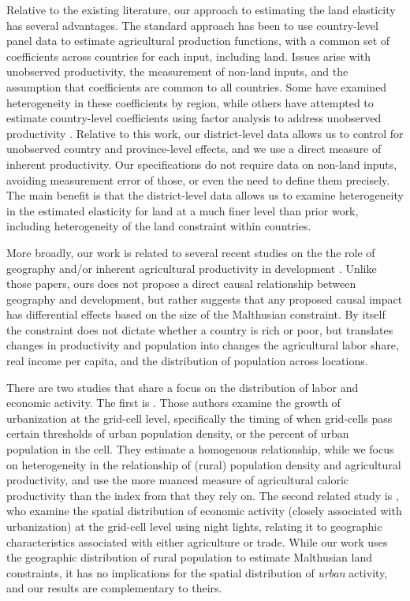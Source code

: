 \documentclass[11pt]{article}
\begin{document}
Relative to the existing literature, our approach to estimating the land elasticity has several advantages. The standard approach has been to use country-level panel data \citep{Hayami:1970ly,Hayami:1985cr,cpr1997,mm2001,Mundlak:2000dq,mbl2012,et2013mango} to estimate agricultural production functions, with a common set of coefficients across countries for each input, including land. Issues arise with unobserved productivity, the measurement of non-land inputs, and the assumption that coefficients are common to all countries. Some have examined heterogeneity in these coefficients \citep{gg2003,Wiebe2003Resource-Qualit} by region, while others have attempted to estimate country-level coefficients using factor analysis to address unobserved productivity \citep{et2013mango,ev2016clim}. Relative to this work, our district-level data allows us to control for unobserved country and province-level effects, and we use a direct measure of inherent productivity. Our specifications do not require data on non-land inputs, avoiding measurement error of those, or even the need to define them precisely. The main benefit is that the district-level data allows us to examine heterogeneity in the estimated elasticity for land at a much finer level than prior work, including heterogeneity of the land constraint within countries. 

More broadly, our work is related to several recent studies on the the role of geography and/or inherent agricultural productivity in development \citep{oh2005,ashraf2010dynamics,Nunn2011,Nunn2012,mich2012,agn2013,cook2014role,cook14,fenske2014,alsan2015,ashrafmich2015,dks2015,galorozak2016,litina2016,ads2016,FrankemaPap2017}. Unlike those papers, ours does not propose a direct causal relationship between geography and development, but rather suggests that any proposed causal impact has differential effects based on the size of the Malthusian constraint. By itself the constraint does not dictate whether a country is rich or poor, but translates changes in productivity and population into changes the agricultural labor share, real income per capita, and the distribution of population across locations.

There are two studies that share a focus on the distribution of labor and economic activity. The first is \citet{mfm2014}. Those authors examine the growth of urbanization at the grid-cell level, specifically the timing of when grid-cells pass certain thresholds of urban population density, or the percent of urban population in the cell. They estimate a homogenous relationship, while we focus on heterogeneity in the relationship of (rural) population density and agricultural productivity, and use the more nuanced measure of agricultural caloric productivity than the index from \citet{ramankutty2002} that they rely on. The second related study is \citet{hssw2016}, who examine the spatial distribution of economic activity (closely associated with urbanization) at the grid-cell level using night lights, relating it to geographic characteristics associated with either agriculture or trade. While our work uses the geographic distribution of rural population to estimate Malthusian land constraints, it has no implications for the spatial distribution of \textit{urban} activity, and our results are complementary to theirs.
\end{document}
